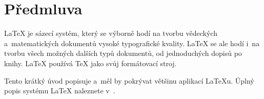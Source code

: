 

\chapter{Předmluva}

\LaTeX{} \cite{manual} je sázecí systém, který se výborně hodí na
tvorbu vědeckých a~matematických dokumentů vysoké typografické kvality.
\LaTeX{} se ale hodí i~na tvorbu všech možných dalších typů dokumentů,
od jednoduchých dopisů po knihy. \LaTeX{}
používá \TeX{} \cite{texbook} jako svůj formátovací stroj.

Tento krátký úvod popisuje \LaTeXe{} a~měl by pokrývat většinu aplikací
\LaTeX u. Úplný popis systému \LaTeX{} naleznete v~\cite{manual,companion}.

